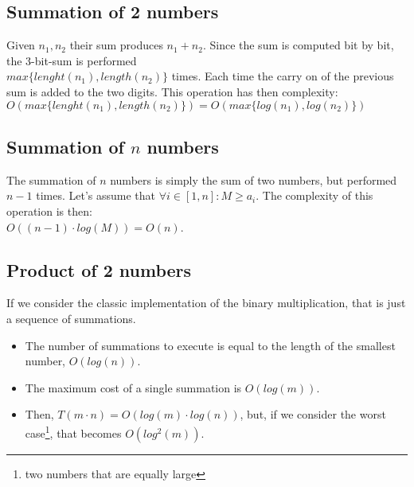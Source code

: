 \subsection{Summation of 2 numbers}
Given $n_{1}, n_{2}$ their sum produces $n_{1} + n_{2}$. \newline
Since the sum is computed bit by bit, the 3-bit-sum is performed\\$max\{lenght(n_{1}), length(n_{2})\}$ times.\newline
Each time the carry on of the previous sum is added to the two digits. \newline
This operation has then complexity:\\$O(max\{lenght(n_{1}), length(n_{2})\}) = O(max\{log(n_{1}), log(n_{2})\})$

\subsection{Summation of $n$ numbers}
The summation of $n$ numbers is simply the sum of two numbers, but performed $n - 1$ times. \newline
Let's assume that $\forall i \in [1,n]: M \geq a_{i}$. \newline
The complexity of this operation is then:\\$O((n-1) \cdot log(M)) = O(n)$. \newline

\subsection{Product of 2 numbers}
If we consider the classic implementation of the binary multiplication, that is just a sequence of summations. \newline
\begin{itemize}
    \item The number of summations to execute is equal to the length of the smallest number, $O(log(n))$.
    \item The maximum cost of a single summation is $O(log(m))$.
    \item Then, $T(m \cdot n) = O(log(m) \cdot log(n))$, but, if we consider the worst case\footnote{two numbers that are equally large}, that becomes $O(log^{2}(m))$.
\end{itemize}

